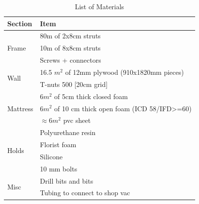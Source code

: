 \documentclass[a4paper, 12pt]{scrartcl}
\begin{document}
\begin{table}[ht]
\centering
\caption{List of Materials}
\label{material}
\begin{tabular}{l l}
\toprule[2pt]
Section & Item\\
\midrule
\multirow{3}{*}{Frame} & 80m of 2x8cm struts \\
	& 10m of 8x8cm struts \\
	& Screws + connectors \\
\midrule
\multirow{2}{*}{Wall} & 16.5 $m^2$ of 12mm plywood (910x1820mm pieces)\\
	& T-nuts 500 [20cm grid] \\
\midrule
\multirow{3}{*}{Mattress} & 6$m^2$ of 5cm thick closed foam\\
	& 6$m^2$ of 10 cm thick open foam (ICD 58/IFD>=60)\\
	& $\approx$6$m^2$ pvc sheet\\
\midrule
\multirow{4}{*}{Holds} & Polyurethane resin\\
	& Florist foam\\
	& Silicone\\
	& 10 mm bolts\\
	\midrule
\multirow{2}{*}{Misc} &  Drill bits and bits\\
	& Tubing to connect to shop vac\\
\bottomrule[2pt]
\end{tabular}
\end{table}
\end{document}
